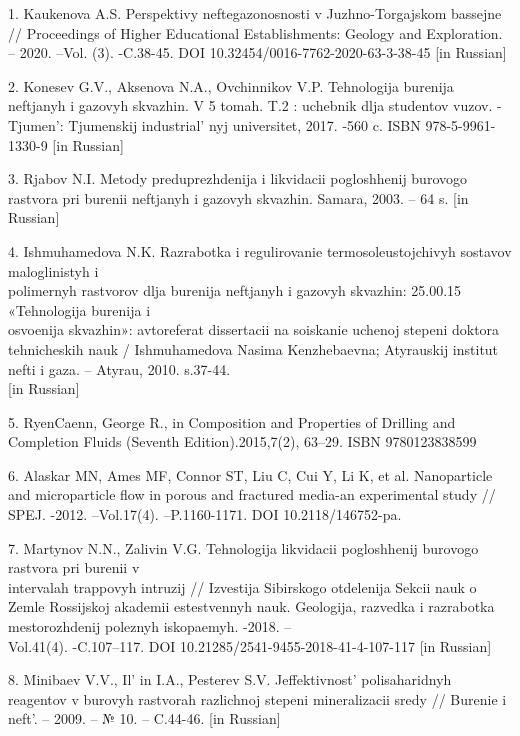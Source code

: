 \begin{references}
1. Kaukenova A.S. Perspektivy neftegazonosnosti v Juzhno-Torgajskom
bassejne // Proceedings of Higher Educational Establishments: Geology
and Exploration. -- 2020. --Vol. (3). -C.38-45. DOI
10.32454/0016-7762-2020-63-3-38-45 {[}in Russian{]}

2. Konesev G.V., Aksenova N.A., Ovchinnikov V.P. Tehnologija burenija
neftjanyh i gazovyh skvazhin. V 5 tomah. T.2 : uchebnik dlja studentov
vuzov. -Tjumen': Tjumenskij
industrial' nyj universitet, 2017. -560 c. ISBN
978-5-9961-1330-9 {[}in Russian{]}

3. Rjabov N.I. Metody preduprezhdenija i likvidacii pogloshhenij
burovogo rastvora pri burenii neftjanyh i gazovyh skvazhin. Samara,
2003. -- 64 s. {[}in Russian{]}

4. Ishmuhamedova N.K. Razrabotka i regulirovanie termosoleustojchivyh
sostavov maloglinistyh i \\polimernyh rastvorov dlja burenija neftjanyh i
gazovyh skvazhin: 25.00.15 «Tehnologija burenija i \\osvoenija skvazhin»:
avtoreferat dissertacii na soiskanie uchenoj stepeni doktora
tehnicheskih nauk / Ishmuhamedova Nasima Kenzhebaevna; Atyrauskij
institut nefti i gaza. -- Atyrau, 2010. s.37-44. \\{[}in Russian{]}

5. RyenCaenn, George R., in Composition and Properties of Drilling and
Completion Fluids (Seventh Edition).2015,7(2), 63--29. ISBN
9780123838599

6. Alaskar MN, Ames MF, Connor ST, Liu C, Cui Y, Li K, et al.
Nanoparticle and microparticle flow in porous and fractured media-an
experimental study // SPEJ. -2012. --Vol.17(4). --P.1160-1171. DOI
10.2118/146752-pa.

7. Martynov N.N., Zalivin V.G. Tehnologija likvidacii pogloshhenij
burovogo rastvora pri burenii v \\intervalah trappovyh intruzij //
Izvestija Sibirskogo otdelenija Sekcii nauk o Zemle Rossijskoj akademii
estestvennyh nauk. Geologija, razvedka i razrabotka mestorozhdenij
poleznyh iskopaemyh. -2018. --\\Vol.41(4). -C.107--117. DOI
10.21285/2541-9455-2018-41-4-107-117 {[}in Russian{]}

8. Minibaev V.V., Il' in I.A., Pesterev S.V.
Jeffektivnost'{} polisaharidnyh reagentov v burovyh
rastvorah razlichnoj stepeni mineralizacii sredy // Burenie i
neft'. -- 2009. -- № 10. -- C.44-46. {[}in Russian{]}


\end{references}
